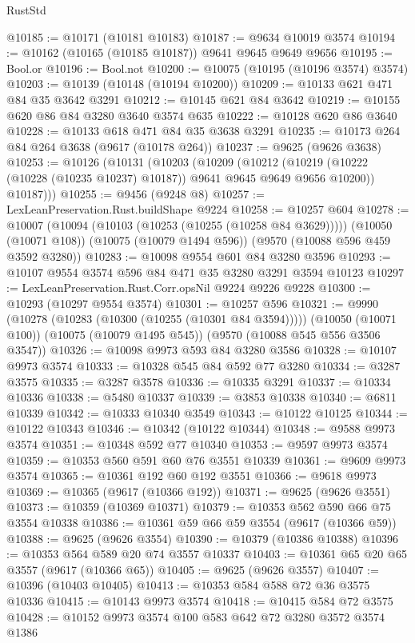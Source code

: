 \begin{lexlean}{RustStd}
\begin{coremodule}
@10185 := @10171 (@10181 @10183)
@10187 := @9634 @10019 @3574
@10194 := @10162 (@10165 (@10185 @10187)) @9641 @9645 @9649 @9656
@10195 := Bool.or
@10196 := Bool.not
@10200 := @10075 (@10195 (@10196 @3574) @3574)
@10203 := @10139 (@10148 (@10194 @10200))
@10209 := @10133 @621 @471 @84 @35 @3642 @3291
@10212 := @10145 @621 @84 @3642
@10219 := @10155 @620 @86 @84 @3280 @3640 @3574 @635
@10222 := @10128 @620 @86 @3640
@10228 := @10133 @618 @471 @84 @35 @3638 @3291
@10235 := @10173 @264 @84 @264 @3638 (@9617 (@10178 @264))
@10237 := @9625 (@9626 @3638)
@10253 := @10126
    (@10131
      (@10203
        (@10209
          (@10212 (@10219 (@10222 (@10228 (@10235 @10237) @10187)) @9641 @9645 @9649 @9656 @10200))
          @10187)))
@10255 := @9456 (@9248 @8)
@10257 := LexLeanPreservation.Rust.buildShape @9224
@10258 := @10257 @604
@10278 := @10007
    (@10094 (@10103 (@10253 (@10255 (@10258 @84 @3629)))))
    (@10050 (@10071 @108))
    (@10075 (@10079 @1494 @596))
    (@9570 (@10088 @596 @459 @3592 @3280))
@10283 := @10098 @9554 @601 @84 @3280 @3596
@10293 := @10107 @9554 @3574 @596 @84 @471 @35 @3280 @3291 @3594 @10123
@10297 := LexLeanPreservation.Rust.Corr.opsNil @9224 @9226 @9228
@10300 := @10293 (@10297 @9554 @3574)
@10301 := @10257 @596
@10321 := @9990
    (@10278 (@10283 (@10300 (@10255 (@10301 @84 @3594)))))
    (@10050 (@10071 @100))
    (@10075 (@10079 @1495 @545))
    (@9570 (@10088 @545 @556 @3506 @3547))
@10326 := @10098 @9973 @593 @84 @3280 @3586
@10328 := @10107 @9973 @3574
@10333 := @10328 @545 @84 @592 @77 @3280
@10334 := @3287 @3575
@10335 := @3287 @3578
@10336 := @10335 @3291
@10337 := @10334 @10336
@10338 := @5480 @10337
@10339 := @3853 @10338
@10340 := @6811 @10339
@10342 := @10333 @10340 @3549
@10343 := @10122 @10125
@10344 := @10122 @10343
@10346 := @10342 (@10122 @10344)
@10348 := @9588 @9973 @3574
@10351 := @10348 @592 @77 @10340
@10353 := @9597 @9973 @3574
@10359 := @10353 @560 @591 @60 @76 @3551 @10339
@10361 := @9609 @9973 @3574
@10365 := @10361 @192 @60 @192 @3551
@10366 := @9618 @9973
@10369 := @10365 (@9617 (@10366 @192))
@10371 := @9625 (@9626 @3551)
@10373 := @10359 (@10369 @10371)
@10379 := @10353 @562 @590 @66 @75 @3554 @10338
@10386 := @10361 @59 @66 @59 @3554 (@9617 (@10366 @59))
@10388 := @9625 (@9626 @3554)
@10390 := @10379 (@10386 @10388)
@10396 := @10353 @564 @589 @20 @74 @3557 @10337
@10403 := @10361 @65 @20 @65 @3557 (@9617 (@10366 @65))
@10405 := @9625 (@9626 @3557)
@10407 := @10396 (@10403 @10405)
@10413 := @10353 @584 @588 @72 @36 @3575 @10336
@10415 := @10143 @9973 @3574
@10418 := @10415 @584 @72 @3575
@10428 := @10152 @9973 @3574 @100 @583 @642 @72 @3280 @3572 @3574 @1386

\end{coremodule}
\end{lexlean}
